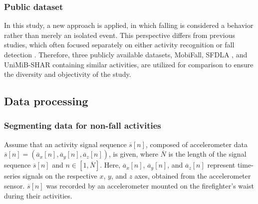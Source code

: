 \documentclass[journal,twoside,web]{ieeecolor}
\begin{document}
\subsubsection{Public dataset}
In this study, a new approach is applied, in which falling is considered a behavior rather than merely an isolated event. This perspective differs from previous studies, which often focused separately on either activity recognition or fall detection \cite{Elder_Falling_2019,Firefighter_Falling_2023,Fall_Elder2022}. Therefore, three publicly available datasets, \footnotemark[1]MobiFall\cite {MobiFall2015}, \footnotemark[2]SFDLA \cite{SFDLAdataset2016}, and \footnotemark[3]UniMiB-SHAR \cite{UniMiB_SHAR_2017} containing similar activities, are utilized for comparison to ensure the diversity and objectivity of the study.

\subsection{Data processing}
\subsubsection{Segmenting data for non-fall activities}

Assume that an activity signal sequence $\overline{s}[n]$, composed of accelerometer data $\overline{s}[n] = (\overline{a}_x[n], \overline{a}_y[n], \overline{a}_z[n])$, is given, where $\overline{N}$ is the length of the signal sequence $\overline{s}[n]$ and $n \in [1, \overline{N}]$. Here, $\overline{a}_x[n]$, $\overline{a}_y[n]$, and $\overline{a}_z[n]$ represent time-series signals on the respective $x$, $y$, and $z$ axes, obtained from the accelerometer sensor. $\overline{s}[n]$ was recorded by an accelerometer mounted on the firefighter's waist during their activities. 
\end{document}
